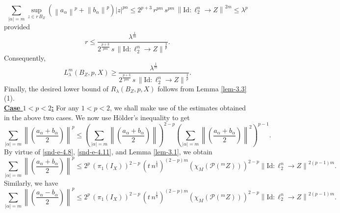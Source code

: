 \documentclass[a4paper,11pt, reqno]{amsart}
\theoremstyle{definition}
\newcommand{\real}{{\operatorname{Re}\,}}
\newcommand{\norm}[1]{\left\lVert#1\right\rVert}
\newcommand{\comment}[1]{}
\begin{document}
	$$
	\sum_{|\alpha|=m} \sup_{z \in r \, B_{Z}} (\norm{a_{\alpha}}^p+\norm{b_{\alpha}}^p)|z|^{p\alpha} \leq 2^{p+3}  \,r^{pm}\, s^{pm}\, \norm{\mathrm{Id}:\ell^n _2 \rightarrow Z}^{2m} \leq \lambda^p
	$$
	provided 
	\begin{equation*}
		r \leq \frac{\lambda^{\frac{1}{m}}}{2^{\frac{p+3}{pm}}\,s\, \norm{\mathrm{Id}:\ell^n _2 \rightarrow Z}^{\frac{2}{p}}}.
	\end{equation*}
	Consequently, 
	$$L^{m}_{\lambda}(B_{Z}, p,X) \geq \frac{\lambda^{\frac{1}{m}}}{2^{\frac{p+3}{pm}}\,s\, \norm{\mathrm{Id}:\ell^n _2 \rightarrow Z}^{\frac{2}{p}}}.$$
	Finally, the desired lower bound of $R_{\lambda}(B_{Z}, p,X)$ follows from Lemma \ref{lem-3.3} (1).\\
	\underline{{\bf Case $1<p<2$:}} For any $1<p<2$, we shall make use of the estimates obtained in the above two cases. We now use H\"{o}lder's inequality to get 
	\begin{equation*}
		\sum_{|\alpha|=m} \norm{\left(\frac{a_{\alpha} + b_{\alpha}}{2}\right)}^p \leq  \left(\sum_{|\alpha|=m} \norm{\left(\frac{a_{\alpha} + b_{\alpha}}{2}\right)}\right)^{2-p} \left(\sum_{|\alpha|=m} \norm{\left(\frac{a_{\alpha} + b_{\alpha}}{2}\right)}^2\right)^{p-1}.
	\end{equation*}
	By virtue of \eqref{snd-e-4.8}, \eqref{snd-e-4.11}, and Lemma \ref{lem-3.1}, we obtain
	$$
	\sum_{|\alpha|=m} \norm{\left(\frac{a_{\alpha} + b_{\alpha}}{2}\right)}^p \leq 2^{p}\,(\pi_{1}(I_{X}))^{2-p}\, \left(t\, n^{\frac{1}{q}}\right)^{(2-p)m} (\chi_{M}(\mathcal{P}(^mZ)))^{2-p} \norm{\mathrm{Id}:\ell^n _2 \rightarrow Z}^{2(p-1) m}.$$
	Similarly, we have
	$$
	\sum_{|\alpha|=m} \norm{\left(\frac{a_{\alpha} - b_{\alpha}}{2}\right)}^p \leq 2^{p}\,(\pi_{1}(I_{X}))^{2-p}\, \left(t\, n^{\frac{1}{q}}\right)^{(2-p)m} (\chi_{M}(\mathcal{P}(^mZ)))^{2-p} \norm{\mathrm{Id}:\ell^n _2 \rightarrow Z}^{2(p-1) m}.$$
	\comment{\begin{align*}
			&\sum_{|\alpha|=m} \norm{\left(\frac{a_{\alpha} + b_{\alpha}}{2}\right)z^{\alpha}}^p \\ \nonumber
			&=\sum_{|\alpha|=m} \norm{\left(\frac{a_{\alpha} + b_{\alpha}}{2}\right)z^{\alpha}}^{p(1-\theta)}\, \norm{\left(\frac{a_{\alpha} + b_{\alpha}}{2}\right)z^{\alpha}}^{p\theta} \\ \nonumber
			& \leq \left(\sum_{|\alpha|=m} \norm{\left(\frac{a_{\alpha} + b_{\alpha}}{2}\right)z^{\alpha}}\right)^{p(1-\theta)} \left(\sum_{|\alpha|=m} \norm{\left(\frac{a_{\alpha} + b_{\alpha}}{2}\right)z^{\alpha}}^2\right)^{\frac{p\theta}{2}} \\ \nonumber
			& \leq (\pi_{1}(I_{X}))^{p(1-\theta)}\, (\chi_{M}(\mathcal{P}(^mZ)))^{p(1-\theta)} \norm{I:\ell^n _2 \rightarrow X}^{p \theta m} \norm{H}^{p}_{B_{Z},X} \\ \nonumber
			& \leq 4^{p}\,(\pi_{1}(I_{X}))^{p(1-\theta)}\, (\chi_{M}(\mathcal{P}(^mZ)))^{p(1-\theta)} \norm{I:\ell^n _2 \rightarrow X}^{p \theta m} \, \norm{I-\real(a_{0})}^{p}\, \norm{f}^p_{B_{Z},X}.
	\end{align*}}
\end{document}
